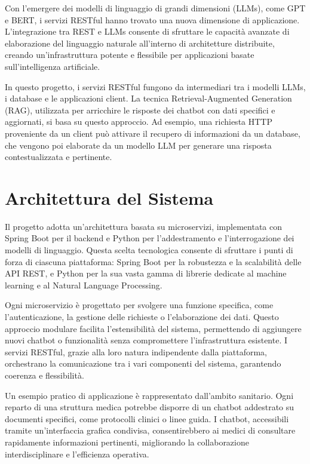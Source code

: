 \documentclass[a4paper,twoside,12pt]{toptesi}
\begin{document}
Con l'emergere dei modelli di linguaggio di grandi dimensioni (LLMs), come GPT e BERT, i servizi RESTful hanno trovato una nuova dimensione di applicazione. L'integrazione tra REST e LLMs consente di sfruttare le capacità avanzate di elaborazione del linguaggio naturale all'interno di architetture distribuite, creando un'infrastruttura potente e flessibile per applicazioni basate sull'intelligenza artificiale.

In questo progetto, i servizi RESTful fungono da intermediari tra i modelli LLMs, i database e le applicazioni client. La tecnica Retrieval-Augmented Generation (RAG), utilizzata per arricchire le risposte dei chatbot con dati specifici e aggiornati, si basa su questo approccio. Ad esempio, una richiesta HTTP proveniente da un client può attivare il recupero di informazioni da un database, che vengono poi elaborate da un modello LLM per generare una risposta contestualizzata e pertinente.

\section{Architettura del Sistema}

Il progetto adotta un'architettura basata su microservizi, implementata con Spring Boot per il backend e Python per l'addestramento e l'interrogazione dei modelli di linguaggio. Questa scelta tecnologica consente di sfruttare i punti di forza di ciascuna piattaforma: Spring Boot per la robustezza e la scalabilità delle API REST, e Python per la sua vasta gamma di librerie dedicate al machine learning e al Natural Language Processing.

Ogni microservizio è progettato per svolgere una funzione specifica, come l'autenticazione, la gestione delle richieste o l'elaborazione dei dati. Questo approccio modulare facilita l'estensibilità del sistema, permettendo di aggiungere nuovi chatbot o funzionalità senza compromettere l'infrastruttura esistente. I servizi RESTful, grazie alla loro natura indipendente dalla piattaforma, orchestrano la comunicazione tra i vari componenti del sistema, garantendo coerenza e flessibilità.

Un esempio pratico di applicazione è rappresentato dall'ambito sanitario. Ogni reparto di una struttura medica potrebbe disporre di un chatbot addestrato su documenti specifici, come protocolli clinici o linee guida. I chatbot, accessibili tramite un'interfaccia grafica condivisa, consentirebbero ai medici di consultare rapidamente informazioni pertinenti, migliorando la collaborazione interdisciplinare e l'efficienza operativa.
\end{document}

